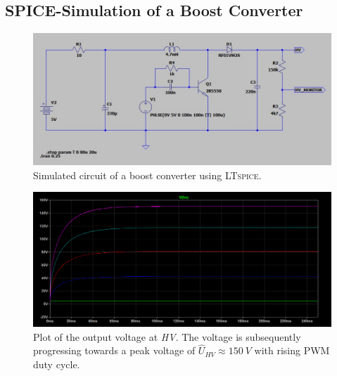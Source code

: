     \subsection*{SPICE-Simulation of a Boost Converter}
        \begin{figure}[h]
            \centering
            \includegraphics[width=\textwidth]{Spice/circuit.jpg}
            \caption[Simulated circuit of a boost converter.]{Simulated circuit of a boost converter using \textsc{LTspice}.}
            \label{fig:simCircuit}
        \end{figure}
        \begin{figure}[h]
            \centering\includegraphics[width=\textwidth]{Spice/plot.jpg}
            \caption{Plot of the output voltage at \textit{HV}. The voltage is subsequently progressing towards a peak voltage of \( \hat{U}_{HV} \approx \SI[]{150}[]{V} \) with rising PWM duty cycle.}
            \label{fig:plotSimCircuit}
        \end{figure}
